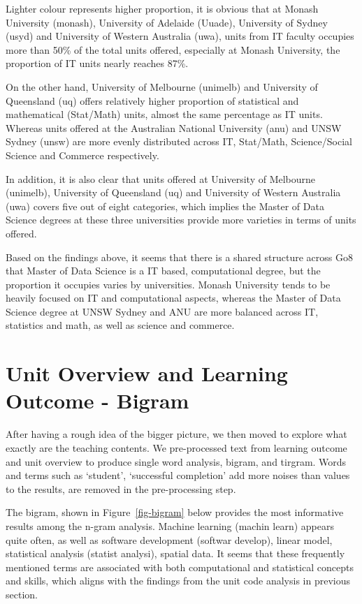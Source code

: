 \documentclass[
  letterpaper,
]{report}
\begin{document}
Lighter colour represents higher proportion, it is obvious that at
Monash University (monash), University of Adelaide (Uuade), University
of Sydney (usyd) and University of Western Australia (uwa), units from
IT faculty occupies more than 50\% of the total units offered,
especially at Monash University, the proportion of IT units nearly
reaches 87\%.

On the other hand, University of Melbourne (unimelb) and University of
Queensland (uq) offers relatively higher proportion of statistical and
mathematical (Stat/Math) units, almost the same percentage as IT units.
Whereas units offered at the Australian National University (anu) and
UNSW Sydney (unsw) are more evenly distributed across IT, Stat/Math,
Science/Social Science and Commerce respectively.

In addition, it is also clear that units offered at University of
Melbourne (unimelb), University of Queensland (uq) and University of
Western Australia (uwa) covers five out of eight categories, which
implies the Master of Data Science degrees at these three universities
provide more varieties in terms of units offered.

Based on the findings above, it seems that there is a shared structure
across Go8 that Master of Data Science is a IT based, computational
degree, but the proportion it occupies varies by universities. Monash
University tends to be heavily focused on IT and computational aspects,
whereas the Master of Data Science degree at UNSW Sydney and ANU are
more balanced across IT, statistics and math, as well as science and
commerce.

\hypertarget{sec-unit-bigram}{%
\section{Unit Overview and Learning Outcome -
Bigram}\label{sec-unit-bigram}}

After having a rough idea of the bigger picture, we then moved to
explore what exactly are the teaching contents. We pre-processed text
from learning outcome and unit overview to produce single word analysis,
bigram, and tirgram. Words and terms such as `student', `successful
completion' add more noises than values to the results, are removed in
the pre-processing step.

The bigram, shown in Figure~\ref{fig-bigram} below provides the most
informative results among the n-gram analysis. Machine learning (machin
learn) appears quite often, as well as software development (softwar
develop), linear model, statistical analysis (statist analysi), spatial
data. It seems that these frequently mentioned terms are associated with
both computational and statistical concepts and skills, which aligns
with the findings from the unit code analysis in previous section.
\end{document}
